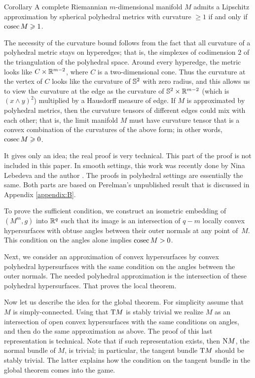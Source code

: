 \documentclass{article}
\begin{document}
\begin{thm}{Corollary}\label{0.3}
A complete Riemannian $m$-dimensional manifold $M$ admits a Lipschitz approximation by
spherical polyhedral metrics with curvature $\ge 1$ 
if and only if $\mathop{\rm cosec}\nolimits M\geqslant 1$.
\end{thm}

The necessity of the curvature bound follows from the fact that all curvature
of a polyhedral metric stays on hyperedges;
that is, the simplexes of codimension $2$ of the triangulation of the polyhedral space.
Around every hyperedge, the metric looks like $C\times \mathbb{R}^{m-2}$,
where $C$ is a two-dimensional cone.
Thus the curvature at the vertex of $C$
looks like the curvature of $\mathbb{S}^2$ with zero radius,
 and this allows us to view the curvature at the edge as the curvature of
$\mathbb{S}^2\times \mathbb{R}^{m-2}$ (which is $(x\wedge y)^2$) multiplied by a
Hausdorff measure of edge.
If $M$ is approximated by polyhedral metrics, then the curvature
tensors of different edges could mix with each other;
that is, the limit manifold $M$ must have curvature tensor that is a convex combination of the curvatures of the above form;
in other words, $\mathop{\rm cosec}\nolimits M\geqslant 0$.

It gives only an idea; the real proof is very technical.
This part of the proof is not included in this paper.
In smooth settings, this work was recently done by Nina Lebedeva and the author \cite{LP}.
The proofs in polyhedral settings are essentially the same. Both parts are based on Perelman's unpublished result that is discussed in Appendix \ref{appendix:B}.

To prove the sufficient condition, we construct an isometric embedding of $(M^m,g)$ into $\mathbb{R}^q$ such that its image is an intersection of $q-m$ locally convex hypersurfaces with obtuse angles between their outer normals at any point of~$M$.
This condition on the angles alone implies $\mathop{\rm cosec}\nolimits M>0$.

Next, we consider an approximation of convex hypersurfaces
by convex polyhedral hypersurfaces with the same condition on the angles between the outer normals.
The needed polyhedral approximation is the intersection of these
polyhedral hypersurfaces. 
That proves the local theorem.

Now let us describe the idea for the global theorem.
For simplicity assume that $M$ is simply-connected.
Using that $\text{\rm T} M$ is stably trivial we realize $M$ as an intersection of open convex hypersurfaces with the same conditions on angles, and then do the same approximation as above.
The proof of this last representation is technical. 
Note that if such representation exists, then $\text{\rm N} M$, the normal bundle of
$M$, is trivial; in particular, the tangent bundle $\text{\rm T} M$ should
be stably trivial.
The latter explains how the condition on the tangent bundle in the global theorem comes into the game.
\end{document}

